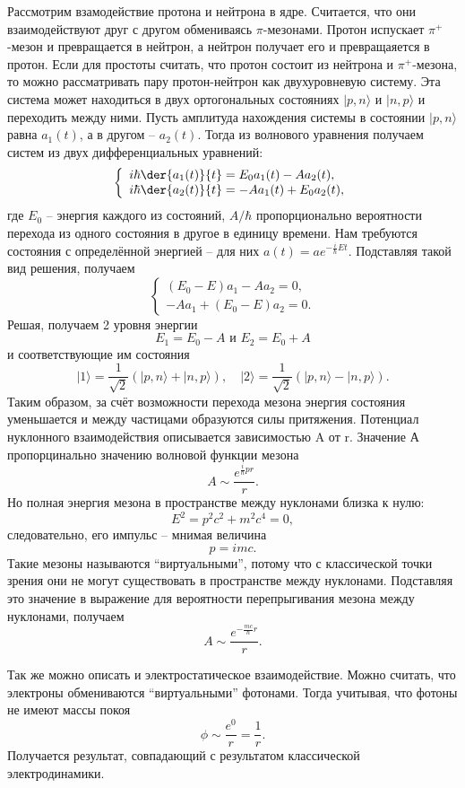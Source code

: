 \newcommand{\bra}[1]{\ensuremath{\langle#1|}}
\newcommand{\ket}[1]{\ensuremath{|#1\rangle}}
Рассмотрим взамодействие протона и нейтрона в ядре. Считается, что они
взаимодействуют друг с другом обмениваясь \( \pi \)-мезонами. Протон испускает
\( \pi^+ \)-мезон и превращается в нейтрон, а нейтрон получает его и
превращаяется в протон. Если для простоты считать, что протон состоит из
нейтрона и \( \pi^+ \)-мезона, то можно рассматривать пару протон-нейтрон как
двухуровневую систему.
Эта система может находиться в двух ортогональных состояниях
\ket{p,n}  и \ket{n,p} и переходить между ними. Пусть амплитуда нахождения
системы в состоянии \ket{p,n} равна \( a_1(t) \), а в другом -- \( a_2(t) \).
Тогда из волнового уравнения получаем систем из двух дифференциальных уравнений:
\[
    \left\{
        \begin{array}{l}
            i\hbar\der{a_1(t)}{t} = E_0 a_1(t) - A a_2(t),\\
            i\hbar\der{a_2(t)}{t} = - A a_1(t) + E_0 a_2(t),
        \end{array}
    \right.
\]
где \( E_0 \) -- энергия каждого из состояний, \( A / \hbar \) пропорционально
вероятности перехода из одного состояния в другое в единицу времени.
Нам требуются состояния с определённой энергией -- для них
\( a(t)  = ae^{-\frac{i}{\hbar}Et} \).
Подставляя такой вид решения, получаем
\[
    \left\{
        \begin{array}{l}
            (E_0-E) a_1 - A a_2 = 0,\\
            - A a_1 + (E_0-E) a_2 = 0.
        \end{array}
    \right.
\]
Решая, получаем 2 уровня энергии
\[
    E_1 = E_0 - A \text{ и } E_2 = E_0 + A
\]
и соответствующие им состояния
\[
    \ket{1} = \frac{1}{\sqrt{2}}(\ket{p,n} + \ket{n,p}),\quad
    \ket{2} = \frac{1}{\sqrt{2}}(\ket{p,n} - \ket{n,p}).
\]
Таким образом, за счёт возможности перехода мезона энергия состояния уменьшается
и между частицами образуются силы притяжения. Потенциал нуклонного
взаимодействия описывается зависимостью A от r. Значение А пропорцинально
значению волновой функции мезона
\[
    A \sim \frac{e^{\frac{i}{\hbar}pr}}{r}.
\]
Но полная энергия мезона в пространстве между нуклонами близка к нулю:
\[
    E^2 = p^2c^2 + m^2c^4 = 0,
\]
следовательно, его импульс -- мнимая величина
\[
    p = imc.
\]
Такие мезоны называются ``виртуальными'', потому что с классической точки зрения
они не могут существовать в пространстве между нуклонами.
Подставляя это значение в выражение для вероятности перепрыгивания мезона между
нуклонами, получаем
\[
    A \sim \frac{e^{-\frac{mc}{\hbar}r}}{r}.
\]

Так же можно описать и электростатическое взаимодействие. Можно считать, что
электроны обмениваются ``виртуальными'' фотонами. Тогда учитывая, что фотоны не
имеют массы покоя
\[
    \phi \sim \frac{e^{0}}{r} = \frac{1}{r}.
\]
Получается результат, совпадающий с результатом классической электродинамики.

